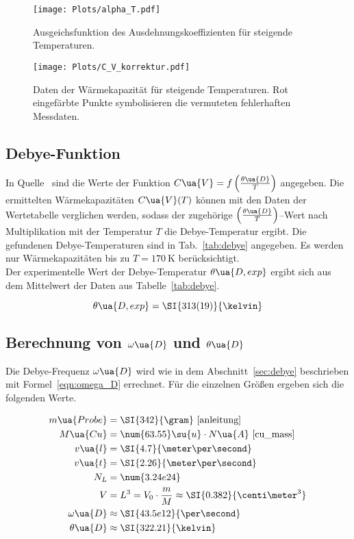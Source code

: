 \begin{figure}[h]
  \centering
  \texttt{[image: Plots/alpha\_T.pdf]}
  \caption{Ausgeichsfunktion des Ausdehnungskoeffizienten für steigende Temperaturen.}
  \label{fig:alpha}
\end{figure}



\FloatBarrier
\begin{figure}
  \centering
  \texttt{[image: Plots/C\_V\_korrektur.pdf]}
  \caption{Daten der Wärmekapazität für steigende Temperaturen. Rot eingefärbte Punkte symbolisieren die vermuteten fehlerhaften Messdaten.}
  \label{fig:c_v}
\end{figure}

\subsection{Debye-Funktion}

In Quelle~\cite{anleitung} sind die Werte der Funktion $C\ua{V} = f\left(\frac{\theta\ua{D}}{T}\right)$
angegeben. Die ermittelten Wärmekapazitäten $C\ua{V}(T)$ können
mit den Daten der Wertetabelle verglichen werden, sodass
der zugehörige $\left(\frac{\theta\ua{D}}{T}\right)$--Wert nach Multiplikation
mit der Temperatur $T$ die Debye-Temperatur ergibt.
Die gefundenen Debye-Temperaturen sind in Tab.~\ref{tab:debye} angegeben.
Es werden nur Wärmekapazitäten bis zu $T = \SI{170}{\kelvin}$ berücksichtigt.\\
Der experimentelle Wert der Debye-Temperatur $\theta\ua{D, exp}$ ergibt sich aus dem Mittelwert
der Daten aus Tabelle~\ref{tab:debye}.

\begin{equation}
  \label{eqn:debye}
  \theta\ua{D, exp} = \SI{313(19)}{\kelvin}
\end{equation}

\subsection{Berechnung von $\omega\ua{D}$ und $\theta\ua{D}$}

Die Debye-Frequenz $\omega\ua{D}$ wird wie in dem Abschnitt~\ref{sec:debye} beschrieben mit Formel~\eqref{eqn:omega_D}
errechnet.
Für die einzelnen Größen ergeben sich die folgenden Werte.

\begin{align*}
  m\ua{Probe} &= \SI{342}{\gram} \text{~\cite{anleitung}}\\
  M\ua{Cu} &= \num{63.55}\su{u}\cdot N\ua{A} \text{~\cite{cu_mass}}\\
  v\ua{l} &= \SI{4.7}{\meter\per\second}\\
  v\ua{t} &= \SI{2.26}{\meter\per\second}\\
  N_L &= \num{3.24e24} \\
  V &= L^3 = V_0\cdot\frac{m}{M}\approx \SI{0.382}{\centi\meter^3}\\
  \omega\ua{D} &\approx \SI{43.5e12}{\per\second}\\
  \theta\ua{D} &\approx \SI{322.21}{\kelvin}
\end{align*}

